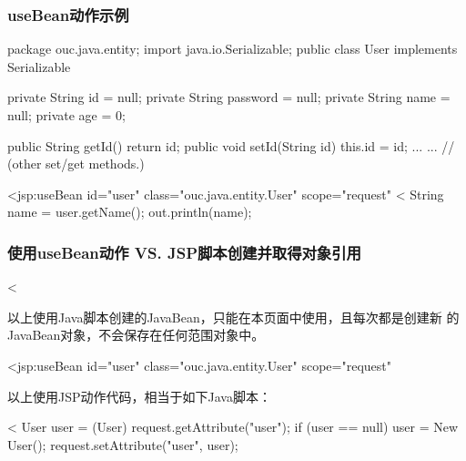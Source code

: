 \subsubsection{useBean动作示例} 


\begin{javaCode}
  package ouc.java.entity;
  import java.io.Serializable;  
  public class User implements Serializable {
    private String id = null;
    private String password = null;
    private String name = null;
    private age = 0;

    public String getId() {
      return id;
    }
    public void setId(String id) {
      this.id = id;
    }
    ... ... // (other set/get methods.)
  }
\end{javaCode}


\begin{jspCode}
  <jsp:useBean id="user" class="ouc.java.entity.User" scope="request" \>
  <%
    String name = user.getName();
    out.println(name);
\end{jspCode}

\subsubsection{使用useBean动作 VS. JSP脚本创建并取得对象引用} 


\begin{jspCode}
  <%
\end{jspCode}


以上使用Java脚本创建的JavaBean，只能在本页面中使用，且每次都是创建新
的JavaBean对象，不会保存在任何范围对象中。


\begin{jspCode}
  <jsp:useBean id="user" class="ouc.java.entity.User" scope="request" \>
\end{jspCode}

以上使用JSP动作代码，相当于如下Java脚本：

\begin{jspCode}
  <%
    User user = (User) request.getAttribute("user");
    if (user == null) {
      user = New User();
      request.setAttribute("user", user);
    }
\end{jspCode}

